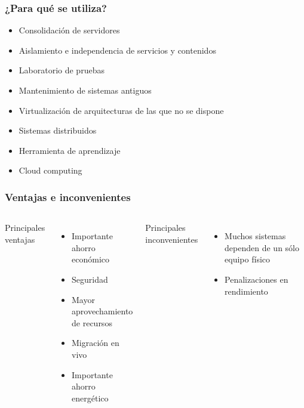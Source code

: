 \documentclass{beamer}
\begin{document}
\begin{frame} \frametitle{¿Para qué se utiliza?}
  \begin{itemize}
  \item Consolidación de servidores
  \item Aislamiento e independencia de servicios y contenidos
  \item Laboratorio de pruebas
  \item Mantenimiento de sistemas antiguos
  \item Virtualización de arquitecturas de las que no se dispone
  \item Sistemas distribuidos
  \item Herramienta de aprendizaje
  \item Cloud computing
  \end{itemize}
\end{frame}

\begin{frame} \frametitle{Ventajas e inconvenientes}
  \begin{columns}
    \begin{description}
    \item [Principales ventajas]
    \end{description}
      \begin{itemize}
      \item Importante ahorro económico
      \item Seguridad
      \item Mayor aprovechamiento de recursos
      \item Migración en vivo
      \item Importante ahorro energético
      \end{itemize}
    \begin{description}
    \item[Principales inconvenientes]
    \end{description}
      \begin{itemize}
      \item Muchos sistemas dependen de un sólo equipo físico
      \item Penalizaciones en rendimiento
      \end{itemize}
  \end{columns}
\end{frame}
\end{document}
